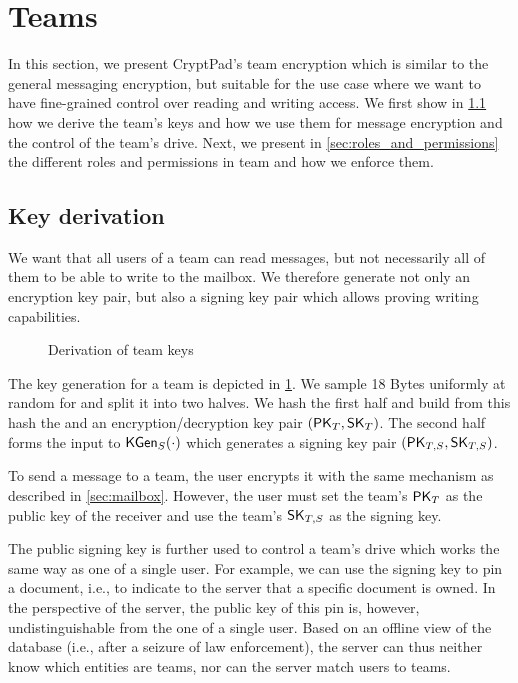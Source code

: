 \section{Teams}
\label{sec:teams}

In this section, we present CryptPad's team encryption which is similar to the general messaging encryption, but suitable for the use case where we want to have fine-grained control over reading and writing access.
We first show in \cref{sec:team_key_derivation} how we derive the team's keys and how we use them for message encryption and the control of the team's drive.
Next, we present in \cref{sec:roles_and_permissions} the different roles and permissions in team and how we enforce them.

\subsection{Key derivation}
\label{sec:team_key_derivation}
We want that all users of a team can read messages, but not necessarily all of them to be able to write to the mailbox.
We therefore generate not only an encryption key pair, but also a signing key pair which allows proving writing capabilities.

\begin{figure}[t!]
  \centering
  
  \caption{Derivation of team keys}
  \label{fig:team_keys}
\end{figure}

The key generation for a team is depicted in \cref{fig:team_keys}.
We sample 18 Bytes uniformly at random for \myseed and split it into two halves.
We hash the first half and build from this hash the \mychanID and an encryption/decryption key pair $\myKeyPair{_T}$.
The second half forms the input to $\myKGen[_S]{\cdot}$ which generates a signing key pair $\myKeyPair{_{T,S}}$.

To send a message to a team, the user encrypts it with the same mechanism as described in \cref{sec:mailbox}.
However, the user must set the team's $\myPK_T$ as the public key of the receiver and use the team's $\mySK_{T,S}$ as the signing key.

The public signing key is further used to control a team's drive which works the same way as one of a single user.
For example, we can use the signing key to pin a document, i.e., to indicate to the server that a specific document is owned.
In the perspective of the server, the public key of this pin is, however, undistinguishable from the one of a single user.
Based on an offline view of the database (i.e., after a seizure of law enforcement), the server can thus neither know which entities are teams, nor can the server match users to teams.

